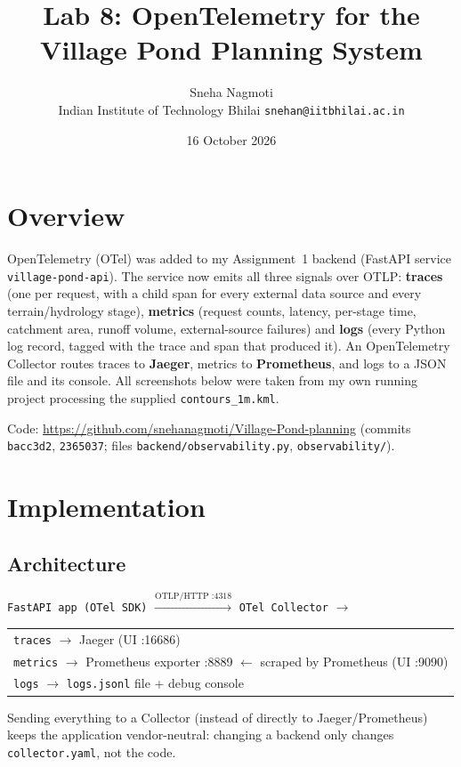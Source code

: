 \documentclass[10.5pt,a4paper]{article}
\title{\textbf{Lab 8: OpenTelemetry for the Village Pond Planning System}}
\author{Sneha Nagmoti \\ \small Indian Institute of Technology Bhilai \quad \texttt{snehan@iitbhilai.ac.in}}
\date{16 October 2026}
\begin{document}
\sloppy
\maketitle

\section{Overview}
OpenTelemetry (OTel) was added to my Assignment~1 backend (FastAPI service \texttt{village-pond-api}). The service now emits all three signals over OTLP: \textbf{traces} (one per request, with a child span for every external data source and every terrain/hydrology stage), \textbf{metrics} (request counts, latency, per-stage time, catchment area, runoff volume, external-source failures) and \textbf{logs} (every Python log record, tagged with the trace and span that produced it). An OpenTelemetry Collector routes traces to \textbf{Jaeger}, metrics to \textbf{Prometheus}, and logs to a JSON file and its console. All screenshots below were taken from my own running project processing the supplied \texttt{contours\_1m.kml}.

Code: \url{https://github.com/snehanagmoti/Village-Pond-planning} (commits \texttt{bacc3d2}, \texttt{2365037}; files \texttt{backend/observability.py}, \texttt{observability/}).

\section{Implementation}
\subsection{Architecture}
\begin{center}
\small
\texttt{FastAPI app (OTel SDK)} $\xrightarrow{\text{OTLP/HTTP :4318}}$ \texttt{OTel Collector} $\rightarrow$
\begin{tabular}{l}
\texttt{traces} $\rightarrow$ Jaeger (UI :16686)\\
\texttt{metrics} $\rightarrow$ Prometheus exporter :8889 $\leftarrow$ scraped by Prometheus (UI :9090)\\
\texttt{logs} $\rightarrow$ \texttt{logs.jsonl} file + debug console
\end{tabular}
\end{center}
Sending everything to a Collector (instead of directly to Jaeger/Prometheus) keeps the application vendor-neutral: changing a backend only changes \texttt{collector.yaml}, not the code.
\end{document}
